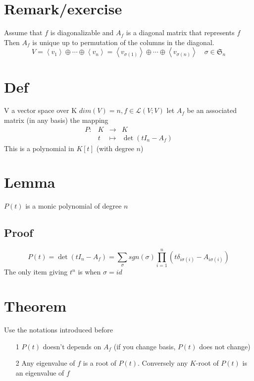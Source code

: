 \documentclass{book}
\begin{document}
\section{Remark/exercise}
Assume that $f$ is diagonalizable and $A_f$ is a diagonal matrix that represents $f$ Then $A_f$ is unique up to permutation of the columns in the diagonal.
$$V=\left<v_1\right>\oplus\cdots\oplus\left<v_n\right>=\left<v_{\sigma(1)}\right>\oplus\cdots\oplus\left<v_{\sigma(n)}\right>\quad \sigma\in \mathfrak{S}_n$$
\section{Def}
V a vector space over K $dim(V)=n,f\in \mathscr{L}(V;V)$ let $A_f$ be an associated matrix (in any basis) the mapping
$$\begin{aligned}
    P: &K &\rightarrow& K\\&t&\mapsto& \det(tI_n-A_f)
\end{aligned}$$
This is a polynomial in $K[t]$ (with degree $n$)
\section{Lemma}
$P(t)$ is a monic polynomial of degree $n$
\subsection*{Proof}
$$P(t)=\det(tI_n-A_f)=\sum\limits_{\sigma}sgn(\sigma)\prod\limits_{i=1}^n(t\delta_{i\sigma(i)}-A_{i\sigma(i)})$$
The only item giving $t^n$ is when $\sigma=id$
\section{Theorem}
Use the notations introduced before
\begin{itemize}
    \item[1]$P(t)$ doesn't depends on $A_f$ (if you change basis, $P(t)$ does not change)
    \item[2] Any eigenvalue of $f$ is a root of $P(t)$. Conversely any $K$-root of $P(t)$ is an eigenvalue of $f$
\end{itemize}
\end{document}

